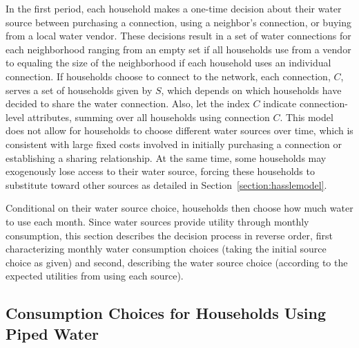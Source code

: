 \documentclass[12pt]{article}
\begin{document}
In the first period, each household makes a one-time decision about their water source between purchasing a connection, using a neighbor's connection, or buying from a local water vendor.  These decisions result in a set of water connections for each neighborhood ranging from an empty set if all households use from a vendor to equaling the size of the neighborhood if each household uses an individual connection.  If households choose to connect to the network, each connection, $C$, serves a set of households given by $S$, which depends on which households have decided to share the water connection.  Also, let the index $C$ indicate connection-level attributes, summing over all households using connection $C$.  This model does not allow for households to choose different water sources over time, which is consistent with large fixed costs involved in initially purchasing a connection or establishing a sharing relationship.  At the same time, some households may exogenously lose access to their water source, forcing these households to substitute toward other sources as detailed in Section~\ref{section:hasslemodel}.

Conditional on their water source choice, households then choose how much water to use each month.  Since water sources provide utility through monthly consumption, this section describes the decision process in reverse order, first characterizing monthly water consumption choices (taking the initial source choice as given) and second, describing the water source choice (according to the expected utilities from using each source).

\subsection{Consumption Choices for Households Using Piped Water}\label{section:consumptionchoice}


\end{document}

